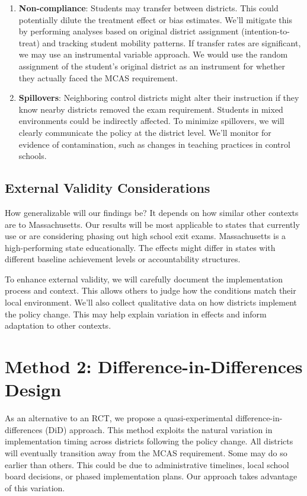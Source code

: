 \documentclass[12pt]{article}
\begin{document}
\begin{enumerate}
    \item \textbf{Non-compliance}: Students may transfer between districts. This could potentially dilute the treatment effect or bias estimates. We'll mitigate this by performing analyses based on original district assignment (intention-to-treat) and tracking student mobility patterns. If transfer rates are significant, we may use an instrumental variable approach. We would use the random assignment of the student's original district as an instrument for whether they actually faced the MCAS requirement.

    \item \textbf{Spillovers}: Neighboring control districts might alter their instruction if they know nearby districts removed the exam requirement. Students in mixed environments could be indirectly affected. To minimize spillovers, we will clearly communicate the policy at the district level. We'll monitor for evidence of contamination, such as changes in teaching practices in control schools.
\end{enumerate}

\subsection{External Validity Considerations}

How generalizable will our findings be? It depends on how similar other contexts are to Massachusetts. Our results will be most applicable to states that currently use or are considering phasing out high school exit exams. Massachusetts is a high-performing state educationally. The effects might differ in states with different baseline achievement levels or accountability structures.

To enhance external validity, we will carefully document the implementation process and context. This allows others to judge how the conditions match their local environment. We'll also collect qualitative data on how districts implement the policy change. This may help explain variation in effects and inform adaptation to other contexts.

\section{Method 2: Difference-in-Differences Design}

As an alternative to an RCT, we propose a quasi-experimental difference-in-differences (DiD) approach. This method exploits the natural variation in implementation timing across districts following the policy change. All districts will eventually transition away from the MCAS requirement. Some may do so earlier than others. This could be due to administrative timelines, local school board decisions, or phased implementation plans. Our approach takes advantage of this variation.
\end{document}
